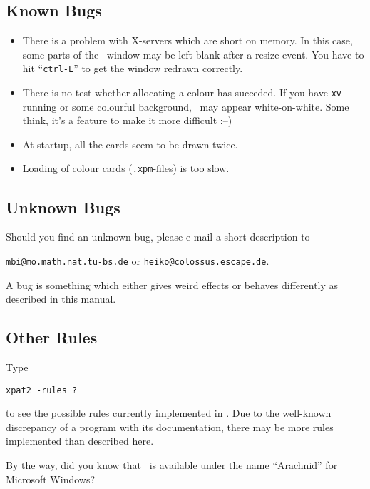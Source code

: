 \subsection{Known Bugs}
\begin{itemize}
\item There is a problem with X-servers which are short on memory. In this
  case, some parts of the \xpat\ window may be left blank after a resize event.
  You have to hit ``{\tt ctrl-L}'' to get the window redrawn correctly.
\item There is no test whether allocating a colour has succeded.  If you have
  {\tt xv} running or some colourful background, \xpat\ may appear
  white-on-white. Some think, it's a feature to make it more difficult :--)
\item At startup, all the cards seem to be drawn twice.
\item Loading of colour cards ({\tt .xpm}-files) is too slow.
\end{itemize}

\subsection{Unknown Bugs}
Should you find an unknown bug, please e-mail a short description to
\begin{center}
  {\tt mbi@mo.math.nat.tu-bs.de} or {\tt heiko@colossus.escape.de}.
\end{center}
A bug is something which either gives weird effects or behaves differently
as described in this manual.

\subsection{Other Rules}
Type
\begin{center}
  {\tt xpat2 -rules ?}
\end{center}
to see the possible rules currently implemented in \xpat.
Due to the well-known discrepancy of a program with its documentation,
there may be more rules implemented than described here.

By the way, did you know that \spider\ is
available under the name ``Arachnid'' for Microsoft Windows?

